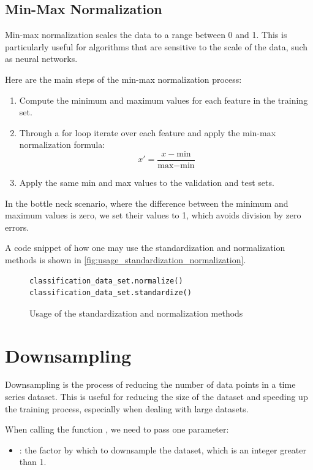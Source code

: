 \documentclass[review]{AIM_report}
\begin{document}
\subsection{Min-Max Normalization}
Min-max normalization scales the data to a range between 0 and 1. This is particularly useful for algorithms that are sensitive to the scale of the data, such as neural networks.

Here are the main steps of the min-max normalization process:
\begin{enumerate}
    \item Compute the minimum and maximum values for each feature in the training set.
    \item Through a for loop iterate over each feature and apply the min-max normalization formula:
          \begin{equation}
              x' = \frac{x - \text{min}}{\text{max} - \text{min}}
          \end{equation}
    \item Apply the same min and max values to the validation and test sets.
\end{enumerate}

In the bottle neck scenario, where the difference between the minimum and maximum values is zero, we set their values to 1, which avoids division by zero errors.

A code snippet of how one may use the standardization and normalization methods is shown in \autoref{fig:usage_standardization_normalization}.
\begin{figure}[H]
    \begin{lstlisting}[style=python]
classification_data_set.normalize()
classification_data_set.standardize()
    \end{lstlisting}
    \caption{Usage of the standardization and normalization methods}
    \label{fig:usage_standardization_normalization}
\end{figure}

\newpage
\section{Downsampling}
Downsampling is the process of reducing the number of data points in a time series dataset. This is useful for reducing the size of the dataset and speeding up the training process, especially when dealing with large datasets.

When calling the function \downsample, we need to pass one parameter:
\begin{itemize}
    \item \factor: the factor by which to downsample the dataset, which is an integer greater than 1.
\end{itemize}
\end{document}
